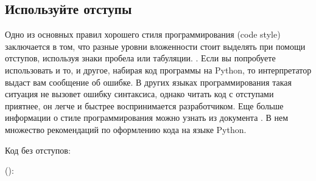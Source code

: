 \documentclass[letterpaper,10pt,russian]{sphinxmanual}
\begin{document}
\subsection{Используйте отступы}
\label{\detokenize{educational_materials/styles/content:id2}}
\sphinxAtStartPar
Одно из основных правил хорошего стиля программирования (code style) заключается в том, что разные уровни вложенности стоит выделять при помощи отступов, используя знаки пробела или табуляции. .
Если вы попробуете использовать и то, и другое, набирая код программы на Python, то интерпретатор выдаст вам сообщение об ошибке. В других языках программирования такая ситуация не вызовет ошибку синтаксиса, однако читать код с отступами приятнее, он легче и быстрее воспринимается разработчиком. Еще больше информации о стиле программирования можно узнать из документа . В нем множество рекомендаций по оформлению кода на языке Python.

\sphinxAtStartPar
Код без отступов:

\sphinxAtStartPar
():

\begin{sphinxVerbatim}[commandchars=\\\{\}]


\end{sphinxVerbatim}
\end{document}

